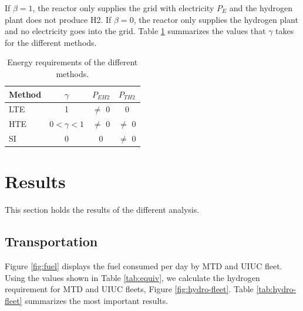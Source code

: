 \documentclass[11pt,letterpaper]{article}
\begin{document}
If $\beta = 1$, the reactor only supplies the grid with electricity $P_E$ and the hydrogen plant does not produce \gls{H2}.
If $\beta = 0$, the reactor only supplies the hydrogen plant and no electricity goes into the grid.
Table \ref{tab:cogen1} summarizes the values that $\gamma$ takes for the different methods.

\begin{table}[htbp!]
    \centering
    \begin{tabular}{|lccc|}
        \hline
        Method    & $\gamma$         & $P_{EH2}$ & $P_{TH2}$ \\ \hline
        \gls{LTE} & 1                & $\ne$ 0   & 0         \\
        \gls{HTE} & $0 < \gamma < 1$ & $\ne$ 0   & $\ne$ 0   \\
        \gls{SI}  & 0                & 0         & $\ne$ 0   \\ \hline
    \end{tabular}
    \caption{Energy requirements of the different methods.}
    \label{tab:cogen1}
\end{table}

\section{Results}
\label{sec:Results}

This section holds the results of the different analysis.

\subsection{Transportation}

Figure \ref{fig:fuel} displays the fuel consumed per day by \gls{MTD} and \gls{UIUC} fleet.
Using the values shown in Table \ref{tab:equiv}, we calculate the hydrogen requirement for MTD and UIUC fleets, Figure \ref{fig:hydro-fleet}.
Table \ref{tab:hydro-fleet} summarizes the most important results.
\end{document}
